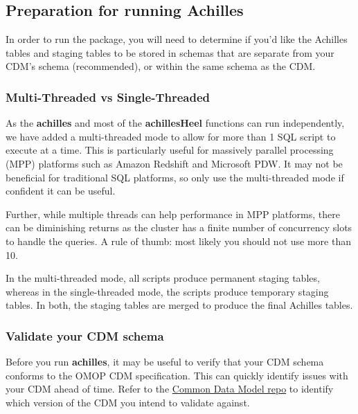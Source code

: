 \documentclass[]{article}
\begin{document}
\subsection{Preparation for running
Achilles}\label{preparation-for-running-achilles}

In order to run the package, you will need to determine if you'd like
the Achilles tables and staging tables to be stored in schemas that are
separate from your CDM's schema (recommended), or within the same schema
as the CDM.

\subsubsection{Multi-Threaded vs
Single-Threaded}\label{multi-threaded-vs-single-threaded}

As the \textbf{achilles} and most of the \textbf{achillesHeel} functions
can run independently, we have added a multi-threaded mode to allow for
more than 1 SQL script to execute at a time. This is particularly useful
for massively parallel processing (MPP) platforms such as Amazon
Redshift and Microsoft PDW. It may not be beneficial for traditional SQL
platforms, so only use the multi-threaded mode if confident it can be
useful.

Further, while multiple threads can help performance in MPP platforms,
there can be diminishing returns as the cluster has a finite number of
concurrency slots to handle the queries. A rule of thumb: most likely
you should not use more than 10.

In the multi-threaded mode, all scripts produce permanent staging
tables, whereas in the single-threaded mode, the scripts produce
temporary staging tables. In both, the staging tables are merged to
produce the final Achilles tables.

\subsubsection{Validate your CDM schema}\label{validate-your-cdm-schema}

Before you run \textbf{achilles}, it may be useful to verify that your
CDM schema conforms to the OMOP CDM specification. This can quickly
identify issues with your CDM ahead of time. Refer to the
\href{https://github.com/OHDSI/CommonDataModel}{Common Data Model repo}
to identify which version of the CDM you intend to validate against.
\end{document}
